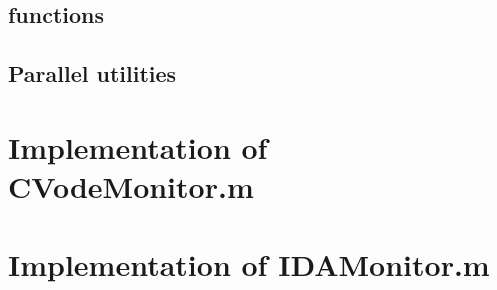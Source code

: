 



\newpage
\subsection{{\nvector} functions}
\rule{0in}{0.25in}










\newpage
\subsection{Parallel utilities}
\rule{0in}{0.25in}






\newpage
\appendix



\section{Implementation of CVodeMonitor.m}



\section{Implementation of IDAMonitor.m}



\newpage

\printindex
